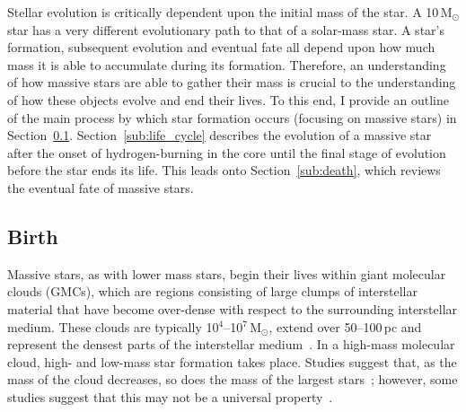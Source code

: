 Stellar evolution is critically dependent upon the initial mass of the star.
A 10\,M$_{\odot}$ star has a very different evolutionary path to that of a solar-mass star.
A star's formation, subsequent evolution and eventual fate all depend upon how much mass it is able to accumulate during its formation.
Therefore, an understanding of how massive stars are able to gather their mass is crucial to the understanding of how these objects evolve and end their lives.
To this end, I provide an outline of the main process by which star formation occurs (focusing on massive stars) in Section~\ref{sub:birth}. Section~\ref{sub:life_cycle} describes the evolution of a massive star after the onset of hydrogen-burning in the core until the final stage of evolution before the star ends its life.
This leads onto Section~\ref{sub:death}, which reviews the eventual fate of massive stars.

\subsection{Birth} %
\label{sub:birth}

Massive stars, as with lower mass stars, begin their lives within giant molecular clouds (GMCs), which are regions consisting of large clumps of interstellar material that have become over-dense with respect to the surrounding interstellar medium.
These clouds are typically 10$^{4}$--10$^{7}$\,M$_{\odot}$, extend over 50--100\,pc and represent the densest parts of the interstellar medium~\citep{Fukui10}.
In a high-mass molecular cloud, high- and low-mass star formation takes place.
Studies suggest that, as the mass of the cloud decreases, so does the mass of the largest stars~\citep{Fukui10,Weidner10}; however, some studies suggest that this may not be a universal property~\citep[e.g.][]{Bressert12}.

